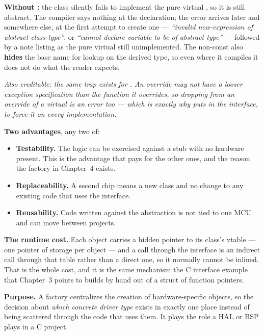 \textbf{Without :} the class silently fails to implement the pure virtual
, so it is still abstract. The compiler says nothing at the declaration; the error
arrives later and somewhere else, at the first attempt to create one --- \emph{``invalid
new-expression of abstract class type''}, or \emph{``cannot declare variable to be of abstract
type''} --- followed by a note listing  as the pure virtual still unimplemented.
The non-const  also \textbf{hides} the base name for lookup on the derived type, so even
where it compiles it does not do what the reader expects. 

\textit{Also creditable: the same trap exists for . An override may not have a looser
exception specification than the function it overrides, so dropping  from an override
of a  virtual is an error too --- which is exactly why  puts
 in the interface, to force it on every implementation.}

\textbf{Two advantages}, any two of: 
\begin{itemize}
  \item \textbf{Testability.} The logic can be exercised against a stub with no hardware present.
    This is the advantage that pays for the other ones, and the reason the factory in Chapter~4
    exists.
  \item \textbf{Replaceability.} A second chip means a new class and no change to any existing code
    that uses the interface.
  \item \textbf{Reusability.} Code written against the abstraction is not tied to one MCU and can
    move between projects.
\end{itemize}

\textbf{The runtime cost.} Each object carries a hidden pointer to its class's vtable --- one pointer
of storage per object --- and a call through the interface is an indirect call through that table
rather than a direct one, so it normally cannot be inlined. That is the whole cost, and it is the
same mechanism the C interface example that Chapter~3 points to builds by hand out of a struct of
function pointers. 


\textbf{Purpose.} A factory centralizes the creation of hardware-specific objects, so the decision
about \emph{which concrete driver type} exists in exactly one place instead of being scattered
through the code that uses them. It plays the role a HAL or BSP plays in a C project.

